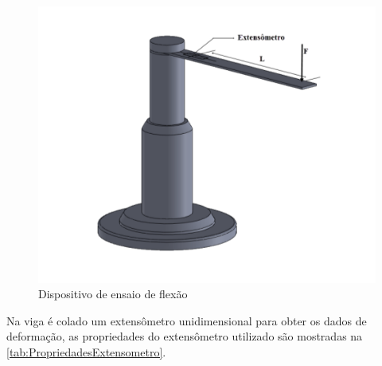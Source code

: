\begin{figure}[htb]
	\caption{\label{fig:2049} Dispositivo de ensaio de flexão}
	\begin{center}
		\includegraphics[width=\textwidth]{pictures/2049.png}
	\end{center}
\end{figure}

Na viga é colado um extensômetro unidimensional para obter os dados de deformação, as propriedades do extensômetro utilizado são mostradas na
\autoref{tab:PropriedadesExtensometro}.

\begin{table}[htb]
\caption[]{Propriedades do extensômetro colado ao dispositivo de flexão}
\label{tab:PropriedadesExtensometro}
\end{table}

